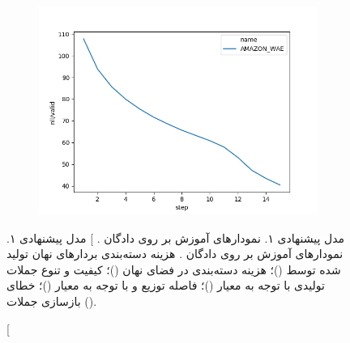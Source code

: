 \begin{figure}[h]
\begin{subfigure}{0.3\textheight}
		\centering
		\includegraphics[width=1.\textwidth]{images/figs2/2020_01_15__11_37_34__nll.png}
		\caption{}
		\label{fig:chap4:amazon_nll}
	\end{subfigure}
	\caption
	[
		مدل پیشنهادی ۱.
		نمودار‌های آموزش \wae{} بر روی دادگان \amazon{}.
	]
	{
		مدل پیشنهادی ۱.
		نمودار‌های آموزش \wae{} بر روی دادگان \amazon{}.
		هزینه دسته‌بندی بردار‌های نهان تولید شده توسط \encoder{}
		()؛
		هزینه دسته‌بندی \classifier{} در فضای نهان
		()؛
		کیفیت و تنوع جملات تولیدی با توجه به معیار \jaccard{}
		()؛
		فاصله توزیع \marginal{} \encoder{} و \priordist{} با توجه به معیار \mmd{}
		()؛
		خطای بازسازی جملات
		().
	}
	\label{fig:chap4:amazon_cond}
\end{figure}


